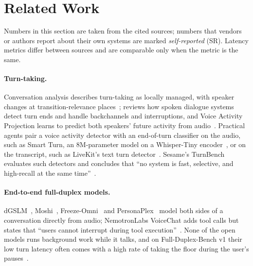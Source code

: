 \section{Related Work}\label{sec:related}

Numbers in this section are taken from the cited sources; numbers that vendors or authors report about
their own systems are marked \emph{self-reported} (SR). Latency metrics differ between sources and are
comparable only when the metric is the same.

\paragraph{Turn-taking.}
Conversation analysis describes turn-taking as locally managed, with speaker changes at
transition-relevance places~\citep{sacks1974turntaking}; \citet{skantze2021review} reviews how spoken
dialogue systems detect turn ends and handle backchannels and interruptions, and Voice Activity
Projection learns to predict both speakers' future activity from audio~\citep{ekstedt2022vap}. Practical
agents pair a voice activity detector with an end-of-turn classifier on the audio, such as Smart Turn, an
8M-parameter model on a Whisper-Tiny encoder~\citep{smartturn_repo,daily2025smartturnv3}, or on the
transcript, such as LiveKit's text turn detector~\citep{livekit_turndetector}. Sesame's TurnBench evaluates
such detectors and concludes that ``no system is fast, selective, and high-recall at the same
time''~\citep{sesame2026turnbench}.

\paragraph{End-to-end full-duplex models.}
dGSLM~\citep{nguyen2023dgslm}, Moshi~\citep{defossez2024moshi}, Freeze-Omni~\citep{wang2024freezeomni} and
PersonaPlex~\citep{roy2026personaplex} model both sides of a conversation directly from audio; NemotronLabs VoiceChat
adds tool calls but states that ``users cannot interrupt during tool execution''~\citep{nvidia2026voicechat}. None of
the open models runs background work while it talks, and on Full-Duplex-Bench v1 their low turn latency often comes
with a high rate of taking the floor during the user's pauses~\citep{fdb_repo}.

